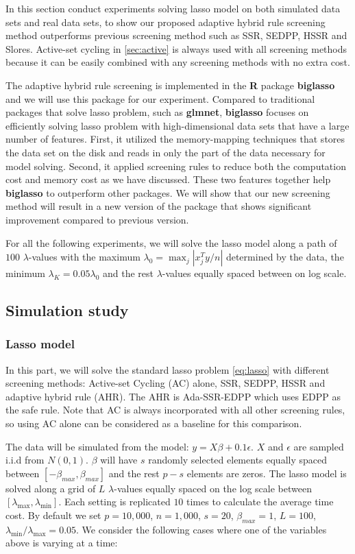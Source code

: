 In this section conduct experiments solving lasso model on both simulated data sets and real data sets, to show our proposed adaptive hybrid rule screening method outperforms previous screening method such as SSR, SEDPP, HSSR and Slores. Active-set cycling in \ref{sec:active} is always used with all screening methods because it can be easily combined with any screening methods with no extra cost.

The adaptive hybrid rule screening is implemented in the \textbf{R} package \textbf{biglasso} and we will use this package for our experiment. Compared to traditional packages that solve lasso problem, such as \textbf{glmnet}, \textbf{biglasso} focuses on efficiently solving lasso problem with high-dimensional data sets that have a large number of features. First, it utilized the memory-mapping techniques that stores the data set on the disk and reads in only the part of the data necessary for model solving. Second, it applied screening rules to reduce both the computation cost and memory cost as we have discussed. These two features together help \textbf{biglasso} to outperform other packages. We will show that our new screening method will result in a new version of the package that shows significant improvement compared to previous version. 

For all the following experiments, we will solve the lasso model along a path of $100$ $\lambda$-values with the maximum $\lambda_0=\max_j|x_j^Ty/n|$ determined by the data, the minimum $\lambda_K=0.05\lambda_0$ and the rest $\lambda$-values equally spaced between on log scale.

\subsection{Simulation study}
\label{sec:sim}

\subsubsection{Lasso model}

In this part, we will solve the standard lasso problem \eqref{eq:lasso} with different screening methods: Active-set Cycling (AC) alone, SSR, SEDPP, HSSR and adaptive hybrid rule (AHR). The AHR is Ada-SSR-EDPP which uses EDPP as the safe rule. Note that AC is always incorporated with all other screening rules, so using AC alone can be considered as a baseline for this comparison.

The data will be simulated from the model: $y=X\beta+0.1\epsilon$. $X$ and $\epsilon$ are sampled i.i.d from $N(0,1)$. $\beta$ will have $s$ randomly selected elements equally spaced between $[-\beta_{max},\beta_{max}]$ and the rest $p-s$ elements are zeros. The lasso model is solved along a grid of $L$ $\lambda$-values equally spaced on the log scale between $[\lambda_{\max},\lambda_{\min}]$. Each setting is replicated $10$ times to calculate the average time cost. By default we set $p=10,000$, $n=1,000$, $s=20$, $\beta_{max}=1$, $L=100$, $\lambda_{\min}/\lambda_{\max}=0.05$. We consider the following cases where one of the variables above is varying at a time:

